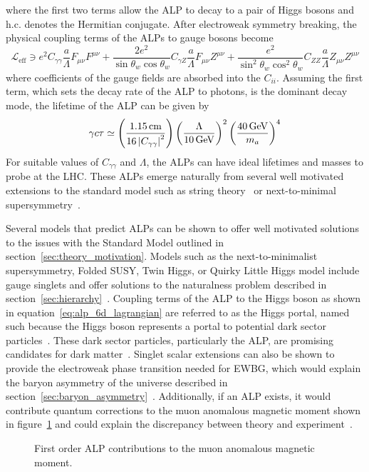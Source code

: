 where the first two terms allow the ALP to decay to a pair of Higgs bosons and h.c. denotes the Hermitian conjugate. After electroweak symmetry breaking, the physical coupling terms of the ALPs to gauge bosons become
\begin{equation}
	\mathcal{L}_\text{eff}\ni e^2C_{\gamma\gamma}\frac{a}{\Lambda}F_{\mu\nu}F^{\mu\nu}+\frac{2e^2}{\sin\theta_w\cos\theta_w}C_{\gamma Z}\frac{a}{\Lambda}F_{\mu\nu}Z^{\mu\nu}+\frac{e^2}{\sin^2\theta_w\cos^2\theta_w}C_{ZZ}\frac{a}{\Lambda}Z_{\mu\nu}Z^{\mu\nu}
\end{equation}
where coefficients of the gauge fields are absorbed into the $C_{ii}$. Assuming the first term, which sets the decay rate of the ALP to photons, is the dominant decay mode, the lifetime of the ALP can be given by~\cite{Draper_2012}
\begin{equation}
	\gamma c\tau\simeq\left(\frac{1.15\unit{cm}}{16\left|C_{\gamma\gamma}\right|^2}\right)\left(\frac{\Lambda}{10\GeV}\right)^2\left(\frac{40\GeV}{m_a}\right)^4
\end{equation}
For suitable values of $C_{\gamma\gamma}$ and $\Lambda$, the ALPs can have ideal lifetimes and masses to probe at the LHC. These ALPs emerge naturally from several well motivated extensions to the standard model such as string theory~\cite{axion_st1,axion_st2,axion_st3} or next-to-minimal supersymmetry~\cite{axion_ss1,axion_ss2}.

Several models that predict ALPs can be shown to offer well motivated solutions to the issues with the Standard Model outlined in section~\ref{sec:theory_motivation}. Models such as the next-to-minimalist supersymmetry, Folded SUSY, Twin Higgs, or Quirky Little Higgs model include gauge singlets and offer solutions to the naturalness problem described in section~\ref{sec:hierarchy}~\cite{hierarchy,hierarchy2}. Coupling terms of the ALP to the Higgs boson as shown in equation~\ref{eq:alp_6d_lagrangian} are referred to as the Higgs portal, named such because the Higgs boson represents a portal to potential dark sector particles~\cite{Curtin_2014}. These dark sector particles, particularly the ALP, are promising candidates for dark matter~\cite{alp_dm1,alp_dm2,alp_dm3,alp_dm4,alp_dm5,alp_dm6}. Singlet scalar extensions can also be shown to provide the electroweak phase transition needed for EWBG, which would explain the baryon asymmetry of the universe described in section~\ref{sec:baryon_asymmetry}~\cite{alp_ewbg1,alp_ewbg2}. Additionally, if an ALP exists, it would contribute quantum corrections to the muon anomalous magnetic moment shown in figure~\ref{fig:muon_magnetic_moment_alp} and could explain the discrepancy between theory and experiment~\cite{alp_colliders}.
\begin{figure}[htb!]
	\centering
	\begingroup
	
	
	\endgroup
	\caption[First order ALP contributions to the muon anomalous magnetic moment.]{First order ALP contributions to the muon anomalous magnetic moment.}
	\label{fig:muon_magnetic_moment_alp}
\end{figure}

